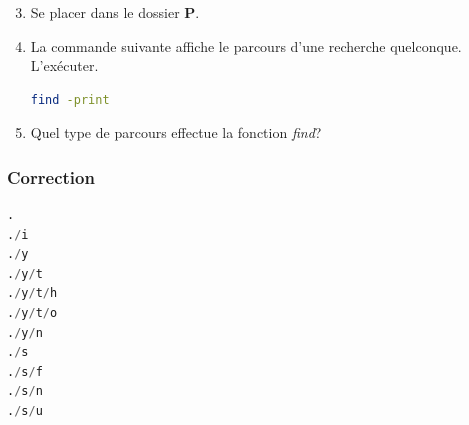 \documentclass[svgnames,11pt]{beamer}
\begin{document}
\begin{frame}[fragile]
    \frametitle{}

    \begin{activite}
    \begin{enumerate}
        \setcounter{enumi}{2}
        \item Se placer dans le dossier \textbf{P}.
            \item La commande suivante affiche le parcours d'une recherche quelconque. L'exécuter.
            \begin{lstlisting}[language=bash , basicstyle=\ttfamily\small, xleftmargin=2em, xrightmargin=2em]
find -print
\end{lstlisting}
            \item Quel type de parcours effectue la fonction \emph{find}?
    \end{enumerate}
    \end{activite}

\end{frame}
\begin{frame}[fragile]
    \frametitle{Correction}

    \begin{center}
    \begin{lstlisting}[language=Python , basicstyle=\ttfamily\small, xleftmargin=2em, xrightmargin=2em]
.
./i
./y
./y/t
./y/t/h
./y/t/o
./y/n
./s
./s/f
./s/n
./s/u        
\end{lstlisting}
    \label{CODE}
    \end{center}

\end{frame}
\end{document}
